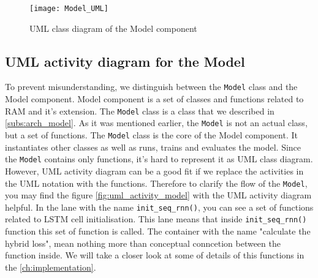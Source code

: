 \begin{figure}[H]
	\texttt{[image: Model\_UML]}
	\caption{UML class diagram of the Model component}
	\label{fig:model_uml}
\end{figure}


\subsection{UML activity diagram for the Model}
\label{subs:model_seq_diagramm}
To prevent misunderstanding, we distinguish between the \lstinline{Model} class
and the Model component. Model component is a set of classes and functions related
to RAM and it's extension. The \lstinline{Model} class is a class that we described
in \autoref{subs:arch_model}.
As it was mentioned earlier, the \lstinline{Model} is not an actual class, but a set of
functions. The \lstinline{Model} class is the core of the Model component. It instantiates
other classes as well as runs, trains
and evaluates the model. Since the \lstinline{Model} contains only functions,
it's hard to represent it as UML class diagram. However, UML activity diagram
can be a good fit if we replace the activities in the UML notation with
the functions. Therefore to clarify the flow of the \lstinline{Model}, you may
find the figure \ref{fig:uml_activity_model} with the UML activity diagram helpful.
In the lane with the name \lstinline{init_seq_rnn()}, you can see a set of functions
related to LSTM cell initialisation. This lane means that inside \lstinline{init_seq_rnn()}
function this set of function is called.
The container with the name "calculate the hybrid loss", mean nothing more than
conceptual conncetion between the function inside.
We will take a closer look at some of details of this functions in the
\autoref{ch:implementation}.


%



